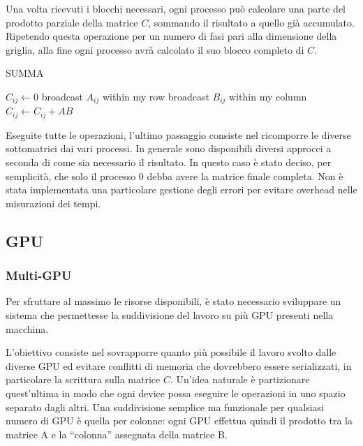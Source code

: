 \documentclass[a4paper]{article}
\begin{document}
Una volta ricevuti i blocchi necessari, ogni processo può calcolare una parte del prodotto parziale della matrice $C$, sommando il risultato a quello già accumulato. Ripetendo questa operazione per un numero di fasi pari alla dimensione della griglia, alla fine ogni processo avrà calcolato il suo blocco completo di $C$.

\begin{algorithm}[h]
    \caption{SUMMA}
    \begin{algorithmic}
        \State $C_{ij} \gets 0$
        \State broadcast $A_{ij}$ within my row
        \State broadcast $B_{ij}$ within my column
        \State $C_{ij} \gets C_{ij} + AB$
        \EndFor
    \end{algorithmic}
\end{algorithm}

Eseguite tutte le operazioni, l'ultimo passaggio consiste nel ricomporre le diverse sottomatrici dai vari processi. In generale sono disponibili diversi approcci a seconda di come sia necessario il risultato. In questo caso è stato deciso, per semplicità, che solo il processo 0 debba avere la matrice finale completa. Non è stata implementata una particolare gestione degli errori per evitare overhead nelle misurazioni dei tempi.

\subsection{GPU}
\subsubsection{Multi-GPU}
Per sfruttare al massimo le risorse disponibili, è stato necessario sviluppare un sistema che permettesse la suddivisione del lavoro su più GPU presenti nella macchina.

L'obiettivo consiste nel sovrapporre quanto più possibile il lavoro svolto dalle diverse GPU ed evitare conflitti di memoria che dovrebbero essere serializzati, in particolare la scrittura sulla matrice $C$. Un'idea naturale è partizionare quest'ultima in modo che ogni device possa eseguire le operazioni in uno spazio separato dagli altri.
Una suddivisione semplice ma funzionale per qualsiasi numero di GPU è quella per colonne: ogni GPU effettua quindi il prodotto tra la matrice A e la ``colonna'' assegnata della matrice B.

\end{document}
